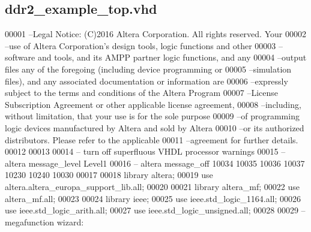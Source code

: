 \subsection{ddr2\+\_\+example\+\_\+top.\+vhd}
\label{ddr2__example__top_8vhd_source}

\begin{DoxyCode}
00001 \textcolor{keyword}{--Legal Notice: (C)2016 Altera Corporation. All rights reserved.  Your}
00002 \textcolor{keyword}{--use of Altera Corporation's design tools, logic functions and other}
00003 \textcolor{keyword}{--software and tools, and its AMPP partner logic functions, and any}
00004 \textcolor{keyword}{--output files any of the foregoing (including device programming or}
00005 \textcolor{keyword}{--simulation files), and any associated documentation or information are}
00006 \textcolor{keyword}{--expressly subject to the terms and conditions of the Altera Program}
00007 \textcolor{keyword}{--License Subscription Agreement or other applicable license agreement,}
00008 \textcolor{keyword}{--including, without limitation, that your use is for the sole purpose}
00009 \textcolor{keyword}{--of programming logic devices manufactured by Altera and sold by Altera}
00010 \textcolor{keyword}{--or its authorized distributors.  Please refer to the applicable}
00011 \textcolor{keyword}{--agreement for further details.}
00012 
00013 
00014 \textcolor{keyword}{-- turn off superfluous VHDL processor warnings }
00015 \textcolor{keyword}{-- altera message\_level Level1 }
00016 \textcolor{keyword}{-- altera message\_off 10034 10035 10036 10037 10230 10240 10030 }
00017 
00018 \textcolor{vhdlkeyword}{library }\textcolor{keywordflow}{altera};
00019 \textcolor{vhdlkeyword}{use }altera.altera\_europa\_support\_lib.\textcolor{keywordflow}{all};
00020 
00021 \textcolor{vhdlkeyword}{library }\textcolor{keywordflow}{altera\_mf};
00022 \textcolor{vhdlkeyword}{use }\textcolor{keywordflow}{altera\_mf.all};
00023 
00024 \textcolor{vhdlkeyword}{library }\textcolor{keywordflow}{ieee};
00025 \textcolor{vhdlkeyword}{use }ieee.std\_logic\_1164.\textcolor{keywordflow}{all};
00026 \textcolor{vhdlkeyword}{use }ieee.std\_logic\_arith.\textcolor{keywordflow}{all};
00027 \textcolor{vhdlkeyword}{use }ieee.std\_logic\_unsigned.\textcolor{keywordflow}{all};
00028 
00029 \textcolor{keyword}{-- megafunction wizard: %
}
\end{DoxyCode}
